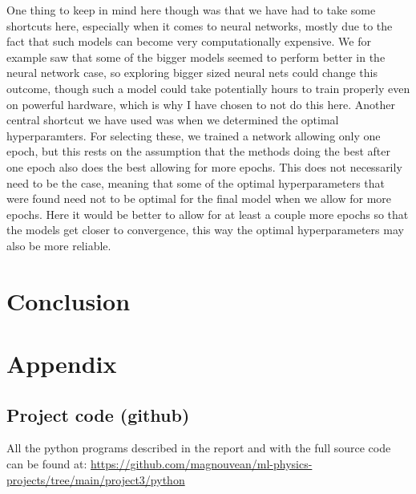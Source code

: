 \documentclass{article}
\begin{document}
One thing to keep in mind here though was that we have had to take some
shortcuts here, especially when it comes to neural networks, mostly due to the
fact that such models can become very computationally expensive. We for example
saw that some of the bigger models seemed to perform better in the neural
network case, so exploring bigger sized neural nets could change this outcome,
though such a model could take potentially hours to train properly even on
powerful hardware, which is why I have chosen to not do this here. Another
central shortcut we have used was when we determined the optimal hyperparamters.
For selecting these, we trained a network allowing only one epoch, but this
rests on the assumption that the methods doing the best after one epoch also
does the best allowing for more epochs. This does not necessarily need to be the
case, meaning that some of the optimal hyperparameters that were found need not
to be optimal for the final model when we allow for more epochs. Here it would
be better to allow for at least a couple more epochs so that the models get
closer to convergence, this way the optimal hyperparameters may also be more
reliable.

\section{Conclusion}

\section{Appendix}

\subsection{Project code (github)}
All the python programs described in the report and with the full source code can be
found at:
\url{https://github.com/magnouvean/ml-physics-projects/tree/main/project3/python}


\end{document}
